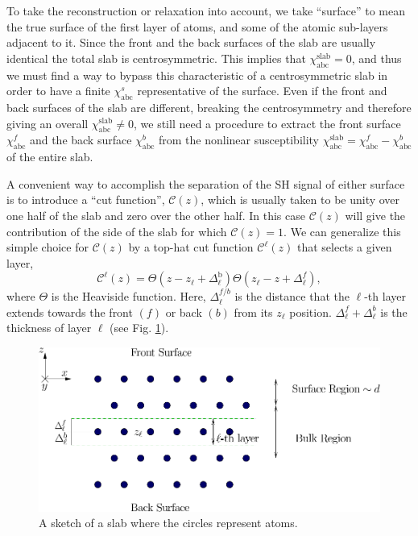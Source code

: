 To take the reconstruction or relaxation into account, we take ``surface'' to
mean the true surface of the first layer of atoms, and some of the atomic
sub-layers adjacent to it. Since the front and the back surfaces of the slab are
usually identical the total slab is centrosymmetric. This implies that
$\chi^{\mathrm{slab}}_{\mathrm{abc}}=0$, and thus we must find a way to bypass
this characteristic of a centrosymmetric slab in order to have a finite
$\chi^s_{\mathrm{abc}}$ representative of the surface. Even if the front and
back surfaces of the slab are different, breaking the centrosymmetry and
therefore giving an overall $\chi^{\mathrm{slab}}_{\mathrm{abc}}\ne 0$, we still
need a procedure to extract the front surface $\chi^f_{\mathrm{abc}}$ and the
back surface $\chi^b_{\mathrm{abc}}$ from the nonlinear susceptibility $\chi^{\mathrm{slab}}_{\mathrm{abc}}=\chi^f_{\mathrm{abc}}-\chi^b_{\mathrm{abc}}$ of the
entire slab.

A convenient way to accomplish the separation of the SH signal of either surface
is to introduce a ``cut function'', $\mathcal{C}(z)$, which is usually taken to be
unity over one half of the slab and zero over the other half.\cite{reiningPRB94}
In this case $\mathcal{C}(z)$ will give the contribution of the side of the slab for
which $\mathcal{C}(z)=1$. We can generalize this simple choice for $\mathcal{C}(z)$ by a
top-hat cut function $\mathcal{C}^{\ell}(z)$ that selects a given layer,
\begin{equation}
\label{sz}
\mathcal{C}^{\ell}(z)=\Theta(z-z_\ell+\Delta_\ell^{\mathrm{b}})
            \Theta(z_\ell-z+\Delta_\ell^f),
\end{equation}
where $\Theta$ is the Heaviside function. Here, $\Delta_\ell^{f/b}$
is the distance that the $\ell$-th layer extends towards the front
$(f)$ or back $(b)$ from its $z_\ell$ position. 
$\Delta_\ell^f+\Delta_\ell^b$ is the thickness of layer $\ell$ 
(see Fig. \ref{fslab}).
\begin{figure}[b]
\centering
\includegraphics[scale=.7]{content/figures/diag-slab}
\caption{A sketch of a slab where the circles represent atoms.\label{fslab}}
\end{figure}

